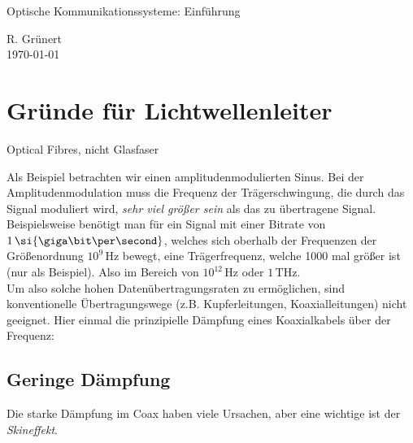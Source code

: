 \documentclass[11pt, a4paper]{article}
\begin{document}
\begin{center}
  \Large{Optische Kommunikationssysteme: Einführung}
\end{center}

\begin{flushright}
  R. Grünert\\
  \today
\end{flushright}

\section{Gründe für Lichtwellenleiter}
\small{Optical Fibres, nicht \glqq Glasfaser\grqq}\\


Als Beispiel betrachten wir einen amplitudenmodulierten Sinus. Bei der Amplitudenmodulation muss die Frequenz der Trägerschwingung, die durch das Signal moduliert wird, \emph{sehr viel größer sein} als das zu übertragene Signal.\\

Beispielsweise benötigt man für ein Signal mit einer Bitrate von $1 \, \si{\giga\bit\per\second}$, welches sich oberhalb der Frequenzen der Größenordnung $10^{9}\,\si{\hertz}$ bewegt, eine Trägerfrequenz, welche 1000 mal größer ist (nur als Beispiel). Also im Bereich von $10^{12}\,\si{\hertz}$ oder $1\,\si{\tera\hertz}$.\\

Um also solche hohen Datenübertragungsraten zu ermöglichen, sind konventionelle Übertragungswege (z.B. Kupferleitungen, Koaxialleitungen) nicht geeignet.
Hier einmal die prinzipielle Dämpfung eines Koaxialkabels über der Frequenz:


\begin{figure}[H]
\centering
{}
\end{figure}

\subsection{Geringe Dämpfung}

\begin{figure}[H]
\centering
{}
\end{figure}

Die starke Dämpfung im Coax haben viele Ursachen, aber eine wichtige ist der \emph{Skineffekt}.
\end{document}
